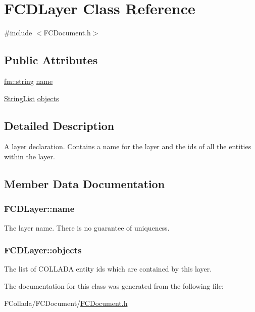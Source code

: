 \hypertarget{classFCDLayer}{
\section{FCDLayer Class Reference}
\label{classFCDLayer}
}


{\ttfamily \#include $<$FCDocument.h$>$}

\subsection*{Public Attributes}
\begin{DoxyCompactItemize}
\item 
\hyperlink{classfm_1_1stringT}{fm::string} \hyperlink{classFCDLayer_a4822be9dda053acf9e716a221ce2238e}{name}
\item 
\hyperlink{classfm_1_1vector}{StringList} \hyperlink{classFCDLayer_a63c94e949b25992748a0f334b8eb2a45}{objects}
\end{DoxyCompactItemize}


\subsection{Detailed Description}
A layer declaration. Contains a name for the layer and the ids of all the entities within the layer. 

\subsection{Member Data Documentation}
\hypertarget{classFCDLayer_a4822be9dda053acf9e716a221ce2238e}{
\subsubsection[{name}]{ {\bf FCDLayer::name}}}
\label{classFCDLayer_a4822be9dda053acf9e716a221ce2238e}
The layer name. There is no guarantee of uniqueness. \hypertarget{classFCDLayer_a63c94e949b25992748a0f334b8eb2a45}{
\subsubsection[{objects}]{ {\bf FCDLayer::objects}}}
\label{classFCDLayer_a63c94e949b25992748a0f334b8eb2a45}
The list of COLLADA entity ids which are contained by this layer. 

The documentation for this class was generated from the following file:\begin{DoxyCompactItemize}
\item 
FCollada/FCDocument/\hyperlink{FCDocument_8h}{FCDocument.h}\end{DoxyCompactItemize}
